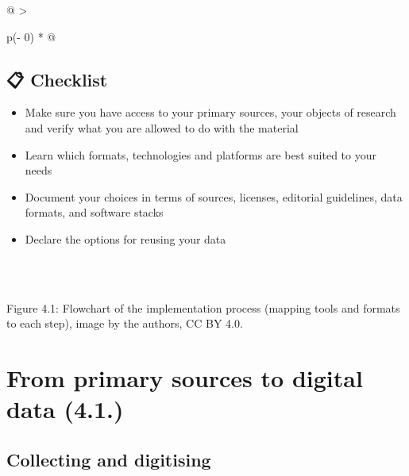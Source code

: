\documentclass[
  letterpaper,
  DIV=11,
  numbers=noendperiod]{scrreprt}
\providecommand{\tightlist}{%
  \setlength{\itemsep}{0pt}\setlength{\parskip}{0pt}}\usepackage{longtable,booktabs,array}
\begin{document}
\begin{longtable}[]{@{}
  >{\raggedright\arraybackslash}p{(\columnwidth - 0\tabcolsep) * }@{}}
\toprule\noalign{}
\begin{minipage}[b]{\linewidth}\raggedright
\subsection{\texorpdfstring{\textbf{📋
Checklist}}{📋 Checklist}}\label{checklist}

\begin{itemize}
\item
  Make sure you have access to your primary sources, your objects of
  research and verify what you are allowed to do with the material\hl{}
\item
  Learn which formats, technologies and platforms are best suited to
  your needs\hl{}
\end{itemize}

\begin{itemize}
\tightlist
\item
  Document your choices in terms of sources, licenses, editorial
  guidelines, data formats, and software stacks\hl{}
\end{itemize}

\begin{itemize}
\tightlist
\item
  Declare the options for reusing your data\hl{}
\end{itemize}

\begin{quote}
\hl{}
\end{quote}
\end{minipage} \\
\midrule\noalign{}
\endhead
\bottomrule\noalign{}
\endlastfoot
 \\
\end{longtable}

Figure 4.1: Flowchart of the implementation process (mapping tools and
formats to each step), image by the authors, CC BY 4.0.

\section{From primary sources to digital data
(4.1.)}\label{from-primary-sources-to-digital-data-4.1.}

\subsection{Collecting and digitising}\label{collecting-and-digitising}
\end{document}
